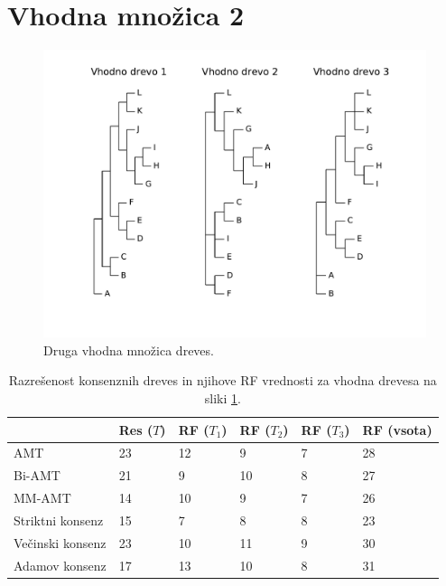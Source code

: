 \documentclass[a4paper, 12pt]{book}
\begin{document}
\section{Vhodna množica 2}
\begin{figure}[h!]
	\begin{center}
		\includegraphics[scale=0.50, clip=true, trim=1cm 2cm 1cm 0]{gfx/eval_input_2.pdf}
	\end{center}
	\caption{Druga vhodna množica dreves.}
	\label{img-eval-input-2}
\end{figure}

\begin{table}[h!]
	\begin{center}
	{\footnotesize
	\begin{tabular}{ l| l | l | l | l | l }
	~                & Res ($T$) & RF ($T_1$) & RF ($T_2$) & RF ($T_3$) & RF (vsota) \\ \hline
	AMT              & 23          & 12            & 9             & 7             & 28         \\ \hline
	Bi-AMT           & 21          & 9             & 10            & 8             & 27         \\ \hline
	MM-AMT           & 14          & 10            & 9             & 7             & 26         \\ \hline
	Striktni konsenz & 15          & 7             & 8             & 8             & 23         \\ \hline
	Večinski konsenz & 23          & 10            & 11            & 9             & 30         \\ \hline
	Adamov konsenz   & 17          & 13            & 10            & 8             & 31         \\ \hline
	\end{tabular}
	\label{table-eval-2}
	\caption{Razrešenost konsenznih dreves in njihove RF vrednosti za vhodna drevesa na sliki \ref{img-eval-input-2}.}
	}
	\end{center}		
\end{table}
\end{document}
